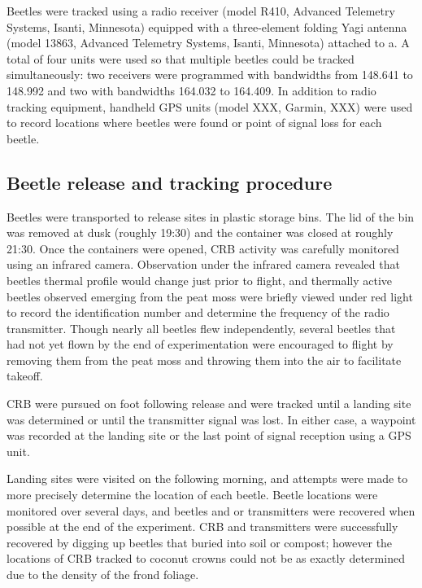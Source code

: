 \documentclass[11pt,letterpaper]{scrartcl}
\begin{document}
Beetles were tracked using a radio receiver (model R410, Advanced Telemetry Systems, Isanti, Minnesota) equipped with a three-element folding Yagi antenna (model 13863, Advanced Telemetry Systems, Isanti, Minnesota) attached to a. A total of four units were used so that multiple beetles could be tracked simultaneously: two receivers were programmed with bandwidths from 148.641 to 148.992 and two with bandwidths 164.032 to 164.409. In addition to radio tracking equipment, handheld GPS units (model XXX, Garmin, XXX) were used to record locations where beetles were found or point of signal loss for each beetle. 

\subsection*{Beetle release and tracking procedure}

Beetles were transported to release sites in plastic storage bins. The lid of the bin was removed at dusk (roughly 19:30) and the container was closed at roughly 21:30. Once the containers were opened, CRB activity was carefully monitored using an infrared camera. Observation under the infrared camera revealed that beetles thermal profile would change just prior to flight, and thermally active beetles observed emerging from the peat moss were briefly viewed under red light to record the identification number and determine the frequency of the radio transmitter. Though nearly all beetles flew independently, several beetles that had not yet flown by the end of experimentation were encouraged to flight by removing them from the peat moss and throwing them into the air to facilitate takeoff.

CRB were pursued on foot following release and were tracked until a landing site was determined or until the transmitter signal was lost. In either case, a waypoint was recorded at the landing site or the last point of signal reception using a GPS unit.

Landing sites were visited on the following morning, and attempts were made to more precisely determine the location of each beetle. Beetle locations were monitored over several days, and beetles and or transmitters were recovered when possible at the end of the experiment.  CRB and transmitters were successfully recovered by digging up beetles that buried into soil or compost; however the locations of CRB tracked to coconut crowns could not be as exactly determined due to the density of the frond foliage. 
\end{document}
